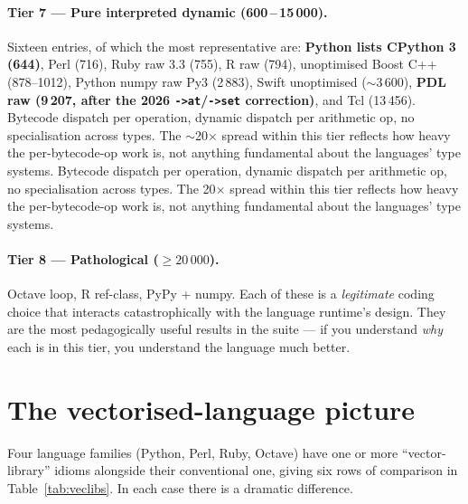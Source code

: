 \documentclass[11pt,a4paper]{article}
\begin{document}
\paragraph{Tier 7 --- Pure interpreted dynamic (600\,--\,15\,000).}
Sixteen entries, of which the most representative are:
\textbf{Python lists CPython 3 (644)}, Perl (716), Ruby raw 3.3 (755),
R raw (794), unoptimised Boost C++ (878--1012), Python numpy raw Py3
(2\,883), Swift unoptimised ($\sim$3\,600), \textbf{PDL raw (9\,207,
after the 2026 \texttt{->at}/\texttt{->set} correction)}, and Tcl
(13\,456). Bytecode dispatch per operation, dynamic dispatch per
arithmetic op, no specialisation across types. The $\sim$20$\times$
spread within this tier reflects how heavy the per-bytecode-op work
is, not anything fundamental about the languages' type systems.
Bytecode dispatch per operation, dynamic dispatch per arithmetic op,
no specialisation across types. The 20$\times$ spread within this
tier reflects how heavy the per-bytecode-op work is, not anything
fundamental about the languages' type systems.

\paragraph{Tier 8 --- Pathological ($\geq 20\,000$).}
Octave loop, R ref-class, PyPy + numpy. Each of these
is a \emph{legitimate} coding choice that interacts catastrophically
with the language runtime's design. They are the most pedagogically
useful results in the suite --- if you understand \emph{why} each is
in this tier, you understand the language much better.

\section{The vectorised-language picture}

Four language families (Python, Perl, Ruby, Octave) have one or
more ``vector-library'' idioms alongside their conventional one,
giving six rows of comparison in Table~\ref{tab:veclibs}. In each
case there is a dramatic difference.
\end{document}
